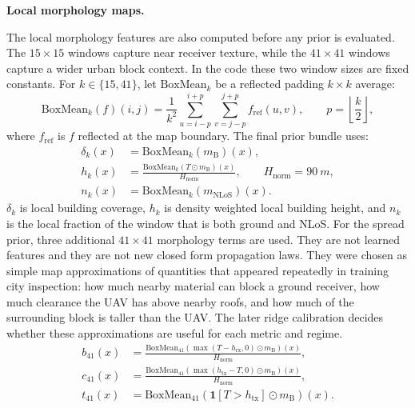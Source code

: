 \par\smallskip
\noindent\textbf{Local morphology maps.}\par
\noindent
The local morphology features are also computed before any prior is evaluated.
The \(15\times15\) windows capture near receiver texture, while the
\(41\times41\) windows capture a wider urban block context. In the code these
two window sizes are fixed constants. For \(k\in\{15,41\}\), let
\(\mathrm{BoxMean}_k\) be a reflected padding \(k\times k\) average:
\begin{equation}
  \mathrm{BoxMean}_k(f)(i,j)
  =
  \frac{1}{k^2}
  \sum_{u=i-p}^{i+p}
  \sum_{v=j-p}^{j+p}
  f_{\mathrm{ref}}(u,v),
  \qquad p=\left\lfloor\frac{k}{2}\right\rfloor,
  \label{eq:boxmean_support}
\end{equation}
where \(f_{\mathrm{ref}}\) is \(f\) reflected at the map boundary. The final
prior bundle uses:
\begin{align}
  \delta_k(x)
  &=
  \mathrm{BoxMean}_k(m_{\mathrm{B}})(x),
  \label{eq:density_support}\\
  h_k(x)
  &=
  \frac{\mathrm{BoxMean}_k(T\odot m_{\mathrm{B}})(x)}{H_{\mathrm{norm}}},
  \qquad H_{\mathrm{norm}}=\SI{90}{m},
  \label{eq:h_support}\\
  n_k(x)
  &=
  \mathrm{BoxMean}_k(m_{\mathrm{NLoS}})(x).
  \label{eq:n_support}
\end{align}
\(\delta_k\) is local building coverage, \(h_k\) is density weighted local
building height, and \(n_k\) is the local fraction of the window that is both
ground and NLoS. For the spread prior, three additional \(41\times41\)
morphology terms are used. They are not learned features and they are not new
closed form propagation laws. They were chosen as simple map approximations of
quantities that appeared repeatedly in training city inspection: how much
nearby material can block a ground receiver, how much clearance the UAV has
above nearby roofs, and how much of the surrounding block is taller than the
UAV. The later ridge calibration decides whether these approximations are
useful for each metric and regime.
\begin{align}
  b_{41}(x)
  &=
  \frac{\mathrm{BoxMean}_{41}\!\left(\max(T-h_{\mathrm{rx}},0)\odot m_{\mathrm{B}}\right)(x)}
       {H_{\mathrm{norm}}},
  \label{eq:blocker_41_support}\\
  c_{41}(x)
  &=
  \frac{\mathrm{BoxMean}_{41}\!\left(\max(h_{\mathrm{tx}}-T,0)\odot m_{\mathrm{B}}\right)(x)}
       {H_{\mathrm{norm}}},
  \label{eq:clearance_41_support}\\
  t_{41}(x)
  &=
  \mathrm{BoxMean}_{41}\!\left(\mathbf{1}[T>h_{\mathrm{tx}}]\odot m_{\mathrm{B}}\right)(x).
  \label{eq:taller_41_support}
\end{align}
